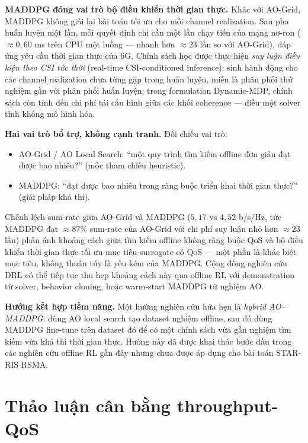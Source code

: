 \textbf{MADDPG đóng vai trò bộ điều khiển thời gian thực.} Khác với
AO-Grid, MADDPG không giải lại bài toán tối ưu cho mỗi channel
realization. Sau pha huấn luyện một lần, mỗi quyết định chỉ cần một
lần chạy tiến của mạng nơ-ron ($\approx 0{,}60$ ms trên CPU một luồng
--- nhanh hơn $\approx 23$ lần so với AO-Grid), đáp ứng yêu cầu thời
gian thực của 6G. Chính sách học được thực hiện \emph{suy luận điều
kiện theo CSI tức thời} (real-time CSI-conditioned inference): sinh
hành động cho các channel realization chưa từng gặp trong huấn luyện,
miễn là phân phối thử nghiệm gần với phân phối huấn luyện; trong
formulation Dynamic-MDP, chính sách còn tính đến chi phí tái cấu hình
giữa các khối coherence --- điều một solver tĩnh không mô hình hóa.

\textbf{Hai vai trò bổ trợ, không cạnh tranh.} Đối chiếu vai trò:
\begin{itemize}[leftmargin=*]
\item AO-Grid / AO Local Search: ``một quy trình tìm kiếm offline đơn
giản đạt được bao nhiêu?'' (mốc tham chiếu heuristic).
\item MADDPG: ``đạt được bao nhiêu trong ràng buộc triển khai thời
gian thực?'' (giải pháp khả thi).
\end{itemize}
Chênh lệch sum-rate giữa AO-Grid và MADDPG ($5{,}17$ vs $4{,}52$
b/s/Hz, tức MADDPG đạt $\approx 87\%$ sum-rate của AO-Grid với chi phí
suy luận nhỏ hơn $\approx 23$ lần) phản ánh khoảng cách giữa tìm kiếm offline
không ràng buộc QoS và bộ điều khiển thời gian thực tối ưu mục tiêu
surrogate có QoS --- một phần là khác biệt mục tiêu, không thuần túy
là yếu kém của MADDPG. Cộng đồng nghiên cứu DRL có thể tiếp tục thu
hẹp khoảng cách này qua offline RL với demonstration từ solver,
behavior cloning, hoặc warm-start MADDPG từ nghiệm AO.

\textbf{Hướng kết hợp tiềm năng.} Một hướng nghiên cứu hứa hẹn là
\emph{hybrid AO--MADDPG}: dùng AO local search tạo dataset nghiệm
offline, sau đó dùng MADDPG fine-tune trên dataset đó để có một chính
sách vừa gần nghiệm tìm kiếm vừa khả thi thời gian thực. Hướng này đã
được khai thác bước đầu trong các nghiên cứu offline RL gần đây nhưng
chưa được áp dụng cho bài toán STAR-RIS RSMA.

\section{Thảo luận cân bằng throughput-QoS}
\label{sec:tradeoff_discussion}

